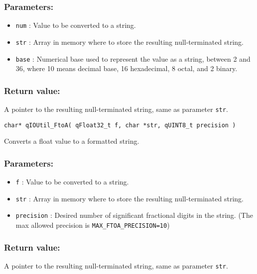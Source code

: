 \subsubsection*{Parameters:}
\begin{itemize}
    \item \lstinline{num} : Value to be converted to a string.
    \item \lstinline{str} : Array in memory where to store the resulting null-terminated string.
    \item \lstinline{base} : Numerical base used to represent the value as a string, between 2 and 36, where 10 means decimal base, 16 hexadecimal, 8 octal, and 2 binary.
\end{itemize}

\subsubsection*{Return value:}
A pointer to the resulting null-terminated string, same as parameter \lstinline{str}.


\noindent\hrulefill

\begin{lstlisting}[style=CStyle]
char* qIOUtil_FtoA( qFloat32_t f, char *str, qUINT8_t precision )
\end{lstlisting}

Converts a float value to a formatted string. 

\subsubsection*{Parameters:}
\begin{itemize}
    \item \lstinline{f} : Value to be converted to a string.
    \item \lstinline{str} : Array in memory where to store the resulting null-terminated string.
    \item \lstinline{precision} : Desired number of significant fractional digits in the string. (The max allowed precision is \lstinline{MAX_FTOA_PRECISION=10})
\end{itemize}

\subsubsection*{Return value:}
A pointer to the resulting null-terminated string, same as parameter \lstinline{str}.


